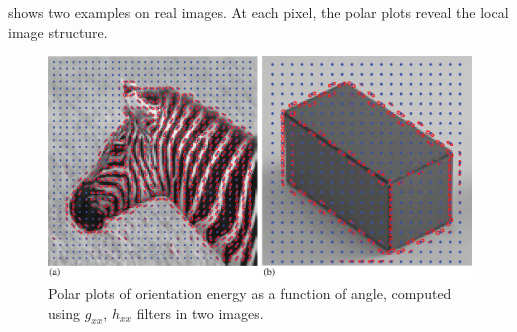 \Fig{\ref{fig:multioriflorets_examples}} shows two examples on real images. At each pixel, the polar plots reveal the local image structure. 


\begin{figure}[t]
\centerline{
\includegraphics[width=1\linewidth]{figures/spatial_filter_sets/steer_quad_polarplot_zebra_cube.eps}
}
\caption{Polar plots of orientation energy as a
  function of angle, computed using $g_{xx}$, $h_{xx}$ filters in two images.}
\label{fig:multioriflorets_examples}
\end{figure}




